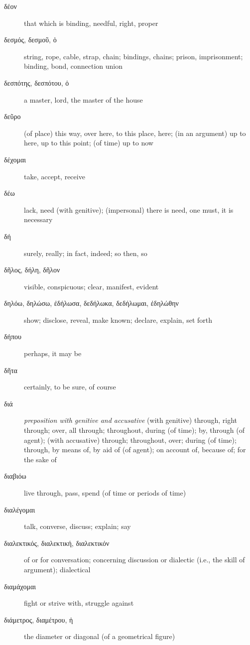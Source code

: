 \documentclass[12pt,letterpaper]{article}
\begin{document}
\begin{description}
    \item[\textgreek{δέον}] \marginnote{*}that which is binding, needful, right, proper
    \item[\textgreek{δεσμός, δεσμοῦ, ὁ}] string, rope, cable, strap, chain; bindings, chains; prison, imprisonment; binding, bond, connection union
    \item[\textgreek{δεσπότης, δεσπότου, ὁ}] a master, lord, the master of the house
    \item[\textgreek{δεῦρο}] (of place) this way, over here, to this place, here; (in an argument) up to here, up to this point; (of time) up to now
    \item[\textgreek{δέχομαι}] take, accept, receive
    \item[\textgreek{δέω}] \marginnote{*}lack, need (with genitive); (impersonal) there is need, one must, it is necessary
    \item[\textgreek{δή}] \marginnote{*}surely, really; in fact, indeed; so then, so
    \item[\textgreek{δῆλος, δήλη, δῆλον}] \marginnote{*}visible, conspicuous; clear, manifest, evident
    \item[\textgreek{δηλόω, δηλώσω, ἐδήλωσα, δεδήλωκα, δεδήλωμαι, ἐδηλώθην}] \marginnote{*}show; disclose, reveal, make known; declare, explain, set forth
    \item[\textgreek{δήπου}] perhaps, it may be
    \item[\textgreek{δῆτα}] certainly, to be sure, of course
    \item[\textgreek{διά}] \marginnote{*}\textit{preposition with genitive and accusative} (with genitive) through, right through; over, all through; throughout, during (of time); by, through (of agent); (with accusative) through; throughout, over; during (of time); through, by means of, by aid of (of agent); on account of, because of; for the sake of
    \item[\textgreek{διαβιόω}] live through, pass, spend (of time or periods of time)
    \item[\textgreek{διαλέγομαι}] talk, converse, discuss; explain; say
    \item[\textgreek{διαλεκτικός, διαλεκτική, διαλεκτικόν}] of or for conversation; concerning discussion or dialectic (i.e., the skill of argument); dialectical
    \item[\textgreek{διαμάχομαι}] fight or strive with, struggle against
    \item[\textgreek{διάμετρος, διαμέτρου, ἡ}] the diameter or diagonal (of a geometrical figure)

\end{description}
\end{document}
